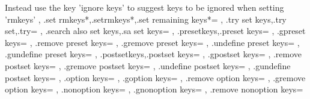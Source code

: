 {{{{{          \MessageBreak Instead use the key 'ignore keys'
          \MessageBreak to suggest keys to be ignored
          \MessageBreak when setting 'rmkeys'}\skv@ehd
      }
    },
    {.set rmkeys*,.setrmkeys*,.set remaining keys*}={
    },
    {.try set keys,.try set,.try}={
    },
    {.search also set keys,.sa set keys}={
    },
    {.presetkeys,.preset keys}={
      \skv@presetkeys
    },
    .gpreset keys={
      \skv@gpresetkeys
    },
    .remove preset keys={
      \skvremovepresetkeys
    },
    .gremove preset keys={
      \skvgremovepresetkeys
    },
    .undefine preset keys={
      \skv@clfalse\dirkeys@dolistedkeys@b\skv@undefpresetkeys
    },
    .gundefine preset keys={
      \skv@cltrue\dirkeys@dolistedkeys@b\skv@undefpresetkeys
    },
    {.postsetkeys,.postset keys}={
      \skv@postsetkeys
    },
    .gpostset keys={
      \skv@gpostsetkeys
    },
    .remove postset keys={
      \skvremovepostsetkeys
    },
    .gremove postset keys={
      \skvgremovepostsetkeys
    },
    .undefine postset keys={
      \skv@clfalse\dirkeys@dolistedkeys@b\skv@undefpostsetkeys
    },
    .gundefine postset keys={
      \skv@cltrue\dirkeys@dolistedkeys@b\skv@undefpresetkeys
    },
    .option keys={
      \skvoptionkeys
    },
    .goption keys={
      \skvgoptionkeys
    },
    .remove option keys={
      \skvremoveoptionkeys
    },
    .gremove option keys={
      \skvgremoveoptionkeys
    },
    .nonoption keys={
      \skvnonoptionkeys
    },
    .gnonoption keys={
      \skvgnonoptionkeys
    },
    .remove nonoption keys={
}}}
